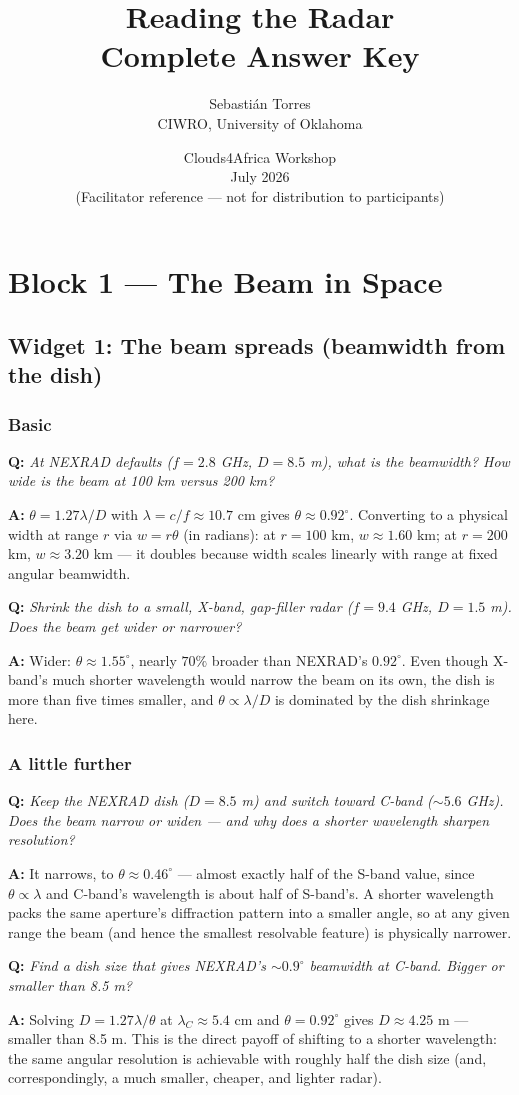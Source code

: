 \documentclass[11pt]{article}
\title{\Huge\bfseries\color{blockblue} Reading the Radar\\[4pt]\Large Complete Answer Key}
\author{Sebasti\'an Torres \\ CIWRO, University of Oklahoma}
\date{Clouds4Africa Workshop \\ July 2026 \\[4pt]\normalsize (Facilitator reference --- not for distribution to participants)}
\newenvironment{qa}[1]{\par\noindent\textbf{\color{qgray}Q: }\emph{#1}\par\noindent\textbf{A: }}{\par\vspace{6pt}}
\newcommand{\tier}[1]{\subsubsection*{#1}}
\begin{document}
\maketitle
\thispagestyle{empty}
\newpage
\tableofcontents
\newpage
\section{Block 1 --- The Beam in Space}

\subsection{Widget 1: The beam spreads (beamwidth from the dish)}

\tier{Basic}
\begin{qa}{At NEXRAD defaults ($f=2.8$ GHz, $D=8.5$ m), what is the beamwidth? How wide is the beam at 100 km versus 200 km?}
$\theta = 1.27\lambda/D$ with $\lambda = c/f \approx 10.7$ cm gives $\theta \approx 0.92^\circ$. Converting to a physical width at range $r$ via $w=r\theta$ (in radians): at $r=100$ km, $w\approx1.60$ km; at $r=200$ km, $w\approx3.20$ km --- it doubles because width scales linearly with range at fixed angular beamwidth.
\end{qa}
\begin{qa}{Shrink the dish to a small, X-band, gap-filler radar ($f=9.4$ GHz, $D=1.5$ m). Does the beam get wider or narrower?}
Wider: $\theta\approx1.55^\circ$, nearly $70\%$ broader than NEXRAD's $0.92^\circ$. Even though X-band's much shorter wavelength would narrow the beam on its own, the dish is more than five times smaller, and $\theta\propto\lambda/D$ is dominated by the dish shrinkage here.
\end{qa}

\tier{A little further}
\begin{qa}{Keep the NEXRAD dish ($D=8.5$ m) and switch toward C-band ($\sim5.6$ GHz). Does the beam narrow or widen --- and why does a shorter wavelength sharpen resolution?}
It narrows, to $\theta\approx0.46^\circ$ --- almost exactly half of the S-band value, since $\theta\propto\lambda$ and C-band's wavelength is about half of S-band's. A shorter wavelength packs the same aperture's diffraction pattern into a smaller angle, so at any given range the beam (and hence the smallest resolvable feature) is physically narrower.
\end{qa}
\begin{qa}{Find a dish size that gives NEXRAD's $\sim0.9^\circ$ beamwidth \emph{at} C-band. Bigger or smaller than 8.5 m?}
Solving $D = 1.27\lambda/\theta$ at $\lambda_C\approx5.4$ cm and $\theta=0.92^\circ$ gives $D\approx4.25$ m --- smaller than 8.5 m. This is the direct payoff of shifting to a shorter wavelength: the same angular resolution is achievable with roughly half the dish size (and, correspondingly, a much smaller, cheaper, and lighter radar).
\end{qa}
\end{document}
